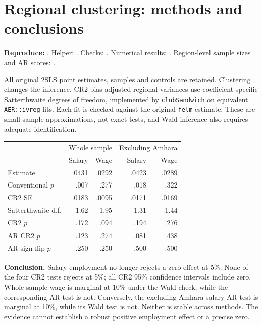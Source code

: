\section{Regional clustering: methods and conclusions}
\textbf{Reproduce:} . Helper:
. Checks:
.
Numerical results: .
Region-level sample sizes and AR scores: .

All original 2SLS point estimates, samples and controls are retained.
Clustering changes the inference. CR2 bias-adjusted regional variances use
coefficient-specific Satterthwaite degrees of freedom, implemented by
\texttt{clubSandwich} on equivalent \texttt{AER::ivreg} fits. Each fit is checked
against the original \texttt{felm} estimate. These are small-sample approximations,
not exact tests, and Wald inference also requires adequate identification.

\begin{center}
\begin{tabular}{lrrrr}
\toprule
 & \multicolumn{2}{c}{Whole sample} & \multicolumn{2}{c}{Excluding Amhara}\\
 & Salary & Wage & Salary & Wage\\\midrule
Estimate & .0431 & .0292 & .0423 & .0289\\
Conventional $p$ & .007 & .277 & .018 & .322\\
CR2 SE & .0183 & .0095 & .0171 & .0169\\
Satterthwaite d.f. & 1.62 & 1.95 & 1.31 & 1.44\\
CR2 $p$ & .172 & .094 & .194 & .276\\
AR CR2 $p$ & .123 & .274 & .081 & .438\\
AR sign-flip $p$ & .250 & .250 & .500 & .500\\\bottomrule
\end{tabular}
\end{center}
\textbf{Conclusion.} Salary employment no longer rejects a zero effect at 5\%.
None of the four CR2 tests rejects at 5\%; all CR2 95\% confidence intervals include
zero. Whole-sample wage is marginal at 10\% under the Wald check, while the
corresponding AR test is not. Conversely, the excluding-Amhara salary AR test is
marginal at 10\%, while its Wald test is not. Neither is stable across methods.
The evidence cannot establish a robust positive employment effect or a precise zero.

